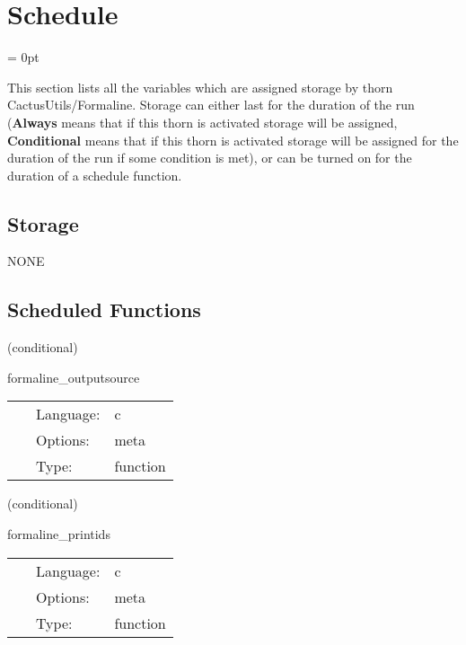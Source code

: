 
\section{Schedule} 


\parskip = 0pt


\noindent This section lists all the variables which are assigned storage by thorn CactusUtils/Formaline.  Storage can either last for the duration of the run ({\bf Always} means that if this thorn is activated storage will be assigned, {\bf Conditional} means that if this thorn is activated storage will be assigned for the duration of the run if some condition is met), or can be turned on for the duration of a schedule function.


\subsection*{Storage}NONE
\subsection*{Scheduled Functions}
\vspace{5mm}

   (conditional) 

\hspace{5mm} formaline\_outputsource 

\hspace{5mm}{\it output cactus source tree } 


\hspace{5mm}

 \begin{tabular*}{160mm}{cll} 
~ & Language:  & c \\ 
~ & Options:  & meta \\ 
~ & Type:  & function \\ 
\end{tabular*} 


\vspace{5mm}

   (conditional) 

\hspace{5mm} formaline\_printids 

\hspace{5mm}{\it print the build and simulation ids } 


\hspace{5mm}

 \begin{tabular*}{160mm}{cll} 
~ & Language:  & c \\ 
~ & Options:  & meta \\ 
~ & Type:  & function \\ 
\end{tabular*} 


